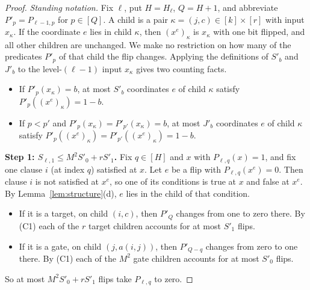 \documentclass[11pt]{article}
\theoremstyle{definition}
\theoremstyle{remark}
\begin{document}
\begin{proof}
\emph{Standing notation.} Fix \(\ell\), put \(H=H_\ell\), \(Q=H+1\), and
abbreviate \(P'_p=P_{\ell-1,p}\) for \(p\in[Q]\). A child is a pair
\(\kappa=(j,c)\in[k]\times[r]\) with input \(x_\kappa\). If the coordinate
\(e\) lies in child \(\kappa\), then \((x^e)_\kappa\) is \(x_\kappa\) with one
bit flipped, and all other children are unchanged. We make no restriction on
how many of the predicates \(P'_p\) of that child the flip changes. Applying
the definitions of \(S'_b\) and \(J'_b\) to the level-\((\ell-1)\) input
\(x_\kappa\) gives two counting facts.
\begin{itemize}[leftmargin=3em]
\item[(C1)] If \(P'_p(x_\kappa)=b\), at most \(S'_b\) coordinates \(e\) of
child \(\kappa\) satisfy \(P'_p((x^e)_\kappa)=1-b\).
\item[(C2)] If \(p<p'\) and \(P'_p(x_\kappa)=P'_{p'}(x_\kappa)=b\), at most
\(J'_b\) coordinates \(e\) of child \(\kappa\) satisfy
\(P'_p((x^e)_\kappa)=P'_{p'}((x^e)_\kappa)=1-b\).
\end{itemize}

\medskip\noindent\textbf{Step 1: \(S_{\ell,1}\le M^2S'_0+rS'_1\).}
Fix \(q\in[H]\) and \(x\) with \(P_{\ell,q}(x)=1\), and fix one clause \(i\)
(at index \(q\)) satisfied at \(x\). Let \(e\) be a flip with
\(P_{\ell,q}(x^e)=0\). Then clause \(i\) is not satisfied at \(x^e\), so one
of its conditions is true at \(x\) and false at \(x^e\). By
Lemma~\ref{lem:structure}(d), \(e\) lies in the child of that condition.
\begin{itemize}[leftmargin=2em]
\item If it is a target, on child \((i,c)\), then \(P'_Q\) changes from one to
zero there. By (C1) each of the \(r\) target children accounts for at most
\(S'_1\) flips.
\item If it is a gate, on child \((j,a(i,j))\), then \(P'_{Q-q}\) changes from
zero to one there. By (C1) each of the \(M^2\) gate children accounts for at
most \(S'_0\) flips.
\end{itemize}
So at most \(M^2S'_0+rS'_1\) flips take \(P_{\ell,q}\) to zero.


\end{proof}
\end{document}

